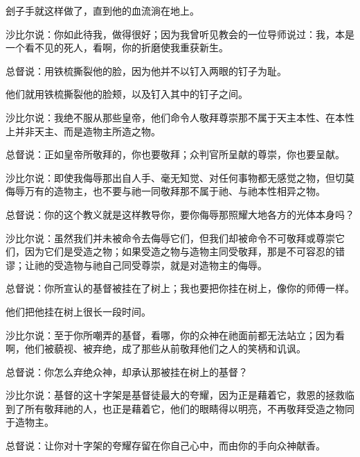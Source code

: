 刽子手就这样做了，直到他的血流淌在地上。\par

沙比尔说：你如此待我，做得很好；因为我曾听见教会的一位导师说过：我，本是一个看不见的死人，看啊，你的折磨使我重获新生。\par

总督说：用铁梳撕裂他的脸，因为他并不以钉入两眼的钉子为耻。\par

他们就用铁梳撕裂他的脸颊，以及钉入其中的钉子之间。\par

沙比尔说：我绝不服从那些皇帝，他们命令人敬拜尊崇那不属于天主本性、在本性上并非天主、而是造物主所造之物。\par

总督说：正如皇帝所敬拜的，你也要敬拜；众判官所呈献的尊崇，你也要呈献。\par

沙比尔说：即使我侮辱那出自人手、毫无知觉、对任何事物都无感觉之物，但切莫侮辱万有的造物主，也不要与祂一同敬拜那不属于祂、与祂本性相异之物。\par

总督说：你的这个教义就是这样教导你，要你侮辱那照耀大地各方的光体本身吗？\par

沙比尔说：虽然我们并未被命令去侮辱它们，但我们却被命令不可敬拜或尊崇它们，因为它们是受造之物；如果受造之物与造物主同受敬拜，那是不可容忍的错谬；让祂的受造物与祂自己同受尊崇，就是对造物主的侮辱。\par

总督说：你所宣认的基督被挂在了树上；我也要把你挂在树上，像你的师傅一样。\par

他们把他挂在树上很长一段时间。\par

沙比尔说：至于你所嘲弄的基督，看哪，你的众神在祂面前都无法站立；因为看啊，他们被藐视、被弃绝，成了那些从前敬拜他们之人的笑柄和讥讽。\par

总督说：你怎么弃绝众神，却承认那被挂在树上的基督？\par

沙比尔说：基督的这十字架是基督徒最大的夸耀，因为正是藉着它，救恩的拯救临到了所有敬拜祂的人，也正是藉着它，他们的眼睛得以明亮，不再敬拜受造之物同于造物主。\par

总督说：让你对十字架的夸耀存留在你自己心中，而由你的手向众神献香。\par

